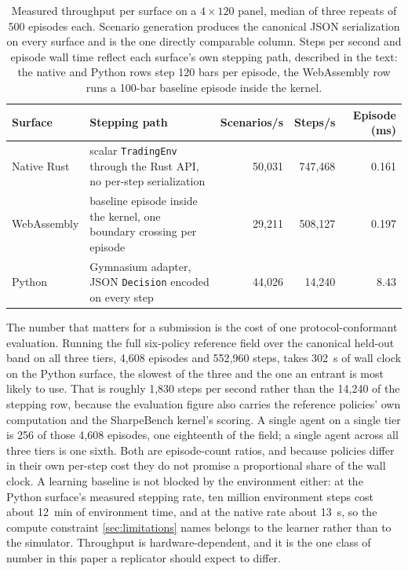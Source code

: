 \begin{table}[t]
\centering
\caption{Measured throughput per surface on a $4\times120$ panel, median of three repeats of 500 episodes each. Scenario generation produces the canonical JSON serialization on every surface and is the one directly comparable column. Steps per second and episode wall time reflect each surface's own stepping path, described in the text: the native and Python rows step 120 bars per episode, the WebAssembly row runs a 100-bar baseline episode inside the kernel.}
\label{tab:throughput}
\small
\setlength{\tabcolsep}{4pt}
\begin{tabular}{l p{5.0cm} rrr}
\toprule
Surface & Stepping path & Scenarios/s & Steps/s & Episode (ms) \\
\midrule
Native Rust & scalar \texttt{TradingEnv} through the Rust API, no per-step serialization & 50{,}031 & 747{,}468 & 0.161 \\
WebAssembly & baseline episode inside the kernel, one boundary crossing per episode & 29{,}211 & 508{,}127 & 0.197 \\
Python & Gymnasium adapter, JSON \texttt{Decision} encoded on every step & 44{,}026 & 14{,}240 & 8.43 \\
\bottomrule
\end{tabular}
\end{table}

The number that matters for a submission is the cost of one protocol-conformant evaluation. Running the full six-policy reference field over the canonical held-out band on all three tiers, 4{,}608 episodes and 552{,}960 steps, takes \SI{302}{\second} of wall clock on the Python surface, the slowest of the three and the one an entrant is most likely to use. That is roughly 1{,}830 steps per second rather than the 14{,}240 of the stepping row, because the evaluation figure also carries the reference policies' own computation and the SharpeBench kernel's scoring. A single agent on a single tier is 256 of those 4{,}608 episodes, one eighteenth of the field; a single agent across all three tiers is one sixth. Both are episode-count ratios, and because policies differ in their own per-step cost they do not promise a proportional share of the wall clock. A learning baseline is not blocked by the environment either: at the Python surface's measured stepping rate, ten million environment steps cost about \SI{12}{\minute} of environment time, and at the native rate about \SI{13}{\second}, so the compute constraint \cref{sec:limitations} names belongs to the learner rather than to the simulator. Throughput is hardware-dependent, and it is the one class of number in this paper a replicator should expect to differ.
